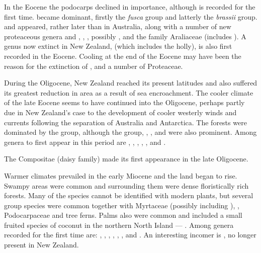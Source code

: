 In the Eocene the podocarps declined in importance, although  is recorded for the first time.  became dominant, firstly the \emph{fusca} group and latterly the \emph{brassii} group.  and  appeared, rather later than in Australia, along with a number of new proteaceous genera and , , , possibly , and the family Araliaceae (includes ).
A genus now extinct in New Zealand,  (which includes the holly), is also first recorded in the Eocene.
Cooling at the end of the Eocene may have been the reason for the extinction of ,  and a number of Proteaceae.

During the Oligocene, New Zealand reached its present latitudes and also suffered its greatest reduction in area as a result of sea encroachment.
The cooler climate of the late Eocene seems to have continued into the Oligocene, perhaps partly due in New Zealand's case to the development of cooler westerly winds and currents following the separation of Australia and Antarctica.
The forests were dominated by the  group, although the  group, , ,  and  were also prominent.
Among genera to first appear in this period are , , , , ,  and .

The Compositae (daisy family) made its first appearance in the late Oligocene.

Warmer climates prevailed in the early Miocene and the land began to rise.
Swampy areas were common and surrounding them were dense floristically rich forests.
Many of the species cannot be identified with modern plants, but several  group species were common together with Myrtaceae (possibly including ), , Podocarpaceae and tree ferns.
Palms also were common and included a small fruited species of coconut in the northern North Island — .
Among genera recorded for the first time are: , , , , , ,  and .
An interesting incomer is , no longer present in New Zealand.

